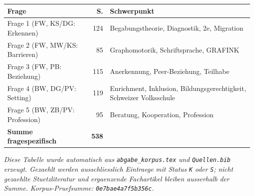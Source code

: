 \begin{tabularx}{\textwidth}{Xr@{\hspace{1.5em}}X}
\toprule
\textbf{Frage} & \textbf{S.} & \textbf{Schwerpunkt} \\
\midrule
Frage 1 (FW, KS/DG: Erkennen) & 124 & Begabungstheorie, Diagnostik, 2e, Migration \\
Frage 2 (FW, MW/KS: Barrieren) & 85 & Graphomotorik, Schriftsprache, GRAFINK \\
Frage 3 (FW, PB: Beziehung) & 115 & Anerkennung, Peer-Beziehung, Teilhabe \\
Frage 4 (BW, DG/PV: Setting) & 119 & Enrichment, Inklusion, Bildungsgerechtigkeit, Schweizer Volksschule \\
Frage 5 (BW, ZB/PV: Profession) & 95 & Beratung, Kooperation, Profession \\
\midrule
\textbf{Summe fragespezifisch} & \textbf{538} & \\
\bottomrule
\end{tabularx}

\vspace{0.8em}
\textit{Diese Tabelle wurde automatisch aus \texttt{abgabe\_korpus.tex} und \texttt{Quellen.bib} erzeugt. Gezaehlt werden ausschliesslich Eintraege mit Status \texttt{K} oder \texttt{S}; nicht gezaehlte Stuetzliteratur und ergaenzende Fachartikel bleiben ausserhalb der Summe. Korpus-Pruefsumme: \texttt{0e7bae4a7f5b356c}.}
